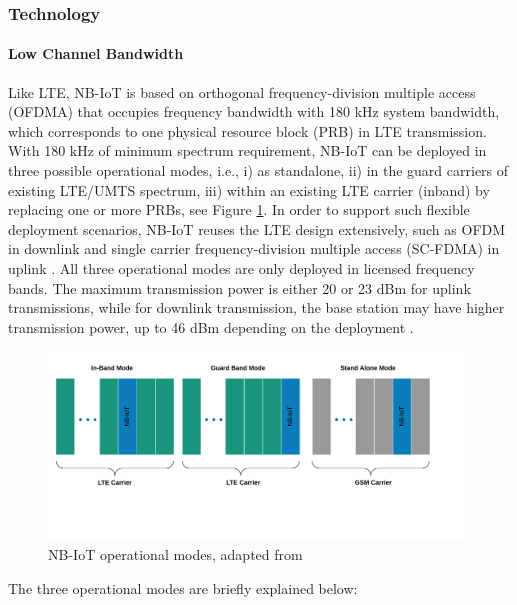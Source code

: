 \documentclass[12pt]{article}
\begin{document}
\subsubsection{Technology}\label{NB-IoT Technology}
\paragraph{Low Channel Bandwidth}

Like LTE, NB-IoT is based on orthogonal frequency-division multiple access (OFDMA) that occupies frequency bandwidth with 180 kHz system bandwidth, which corresponds to one physical resource block (PRB) in LTE transmission. With 180 kHz of minimum spectrum requirement, NB-IoT can be deployed in three possible operational modes, i.e., i) as standalone, ii) in the guard carriers of existing LTE/UMTS spectrum, iii) within an existing LTE carrier (inband) by replacing one or more PRBs, see Figure \ref{fig:NB-IoT operational modes}. In order to support such flexible deployment scenarios, NB-IoT reuses the LTE design extensively, such as OFDM in downlink and single carrier frequency-division multiple access (SC-FDMA) in uplink \cite{8612009,malik2018radio,sinha2017survey,boisguene2017survey}. All three operational modes are only deployed  in licensed frequency bands. The maximum transmission power is either 20 or 23 dBm for uplink transmissions, while for downlink transmission, the base station may have higher transmission power, up to 46 dBm depending on the deployment \cite{farrell2018low}.\par
\begin{figure}[H]
    \centering
    \includegraphics[width=0.9\columnwidth, height=5cm, keepaspectratio]{Images/nbiotModes.pdf}
    \caption{NB-IoT operational modes, adapted from \cite{xu2017narrowband,mekki2019comparative}}
    \label{fig:NB-IoT operational modes}
\end{figure}
The three operational modes are briefly explained below:
\renewcommand{\labelenumi}{\roman{enumi}}
\end{document}
